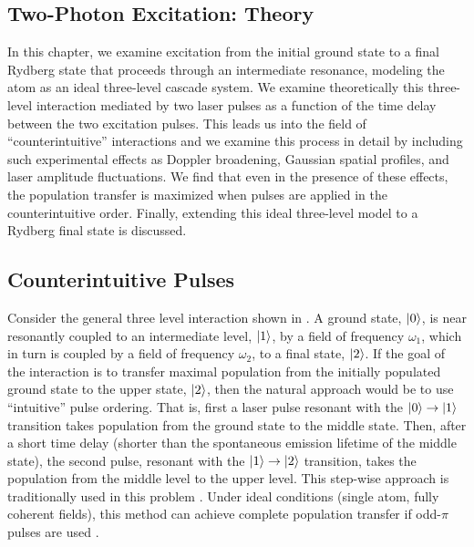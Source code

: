 \begin{singlespace}

\chapter{Two-Photon Excitation: Theory}
\label{citheory}
\begpagestyle

\end{singlespace}


In this chapter, we examine excitation from the initial ground state to a
final Rydberg state that proceeds through an intermediate resonance, modeling
the atom as an ideal three-level cascade system.  We examine theoretically
this three-level interaction mediated by two laser pulses as a function of
the time delay between the two excitation pulses.  This leads us into the
field of ``counterintuitive'' interactions \cite{Shore:95a} and we examine
this process in detail by including such experimental effects as Doppler
broadening, Gaussian spatial profiles, and laser amplitude fluctuations.  We
find that even in the presence of these effects, the population transfer is
maximized when pulses are applied in the counterintuitive order.  Finally,
extending this ideal three-level model to a Rydberg final state is discussed.

\section{Counterintuitive Pulses}
\label{CI}

\hspace{\parindent} Consider the general three level interaction shown in
.  A ground state, $\vert 0 \rangle$, is near resonantly coupled to
an intermediate level, $\vert 1 \rangle$, by a field of frequency $\omega_1$, which
in turn is coupled by a field of frequency $\omega_2$, to a final state,
$\vert 2 \rangle$.  If the goal of the interaction is to transfer maximal population
from the initially populated ground state to the upper state, $\vert 2 \rangle$,
then the natural approach would be to use ``intuitive'' pulse ordering.  That
is, first a laser pulse resonant with the $\vert 0 \rangle \rightarrow \vert 1 \rangle$
transition takes population from the ground state to the middle state.
Then, after a short time delay (shorter than the spontaneous emission
lifetime of the middle state), the second pulse, resonant with the
$\vert 1 \rangle \rightarrow \vert 2 \rangle$ transition, takes the population from the
middle level to the upper level.  This step-wise approach is
traditionally used in this problem \cite{Stebbings_book}.  Under ideal
conditions (single atom, fully coherent fields), this method can achieve
complete population transfer if odd-$\pi$ pulses are used \cite{Allen:87}.

